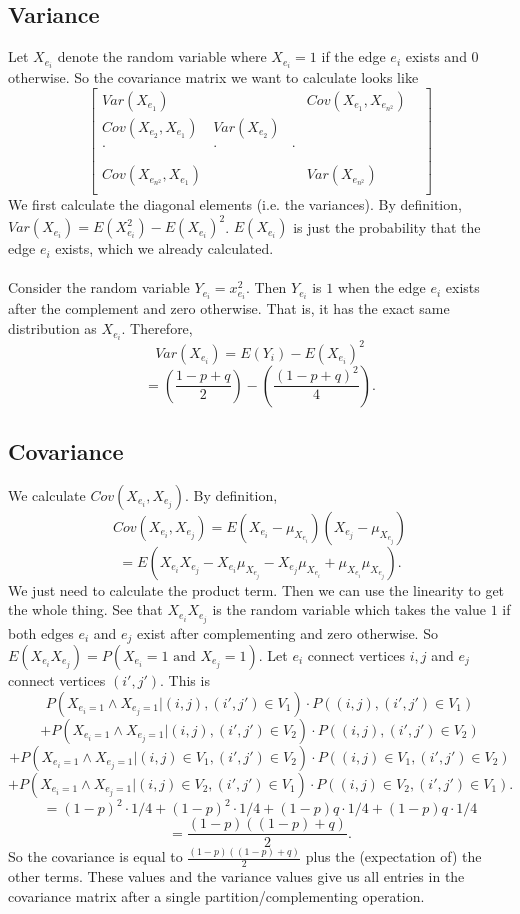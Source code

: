 \documentclass{article}
\begin{document}
\subsection{Variance}
Let $X_{e_i}$ denote the random variable where $X_{e_i} = 1$ if the edge $e_i$ exists and $0$ otherwise. So the covariance matrix we want to calculate looks like $$\begin{bmatrix}
    Var(X_{e_1}) & & & Cov(X_{e_1}, X_{e_{n^2}})\\
    Cov(X_{e_2}, X_{e_1}) & Var(X_{e_2}) & & & \\
    . & . & . \\
    \\
    \\
    Cov(X_{e_{n^2}}, X_{e_1}) & & & Var(X_{e_{n^2}})\\
\end{bmatrix}$$
We first calculate the diagonal elements (i.e. the variances). By definition, $Var(X_{e_i}) = E(X_{e_i}^2) - E(X_{e_i})^2$. $E(X_{e_i})$ is just the probability that the edge $e_i$ exists, which we already calculated. 
\\
\\
Consider the random variable $Y_{e_i} = x_{e_i}^2$. Then $Y_{e_i}$ is $1$ when the edge $e_i$ exists after the complement and zero otherwise. That is, it has the exact same distribution as $X_{e_i}$. Therefore, $$Var(X_{e_i}) = E(Y_i) - E(X_{e_i})^2$$ $$= \left( \frac{1 - p + q}{2}\right) - \left(\frac{(1-p+q)^2}{4}\right).$$ 
\subsection{Covariance}
We calculate $Cov(X_{e_i}, X_{e_j})$. By definition, $$Cov(X_{e_i}, X_{e_j}) = E(X_{e_i} - \mu_{X_{e_i}})(X_{e_j} - \mu_{X_{e_j}})$$ $$= E(X_{e_i}X_{e_j} - X_{e_i}\mu_{X_{e_j}} - X_{e_j}\mu_{X_{e_i}} + \mu_{X_{e_i}}\mu_{X_{e_j}}).$$ We just need to calculate the product term. Then we can use the linearity to get the whole thing. See that $X_{e_i}X_{e_j}$ is the random variable which takes the value $1$ if both edges $e_i$ and $e_j$ exist after complementing and zero otherwise. So $E(X_{e_i}X_{e_j}) = P(X_{e_i} = 1 \text{ and }X_{e_j} = 1)$. Let $e_i$ connect vertices $i,j$ and $e_j$ connect vertices $(i',j')$. This is $$P(X_{e_i = 1} \land X_{e_j = 1} | (i,j), (i',j') \in V_1) \cdot P((i,j),(i',j') \in V_1)$$ $$+ P(X_{e_i = 1} \land X_{e_j = 1} | (i,j), (i',j') \in V_2) \cdot P((i,j),(i',j') \in V_2)$$ $$+ P(X_{e_i = 1} \land X_{e_j = 1} | (i,j) \in V_1, (i',j') \in V_2) \cdot P((i,j)\in V_1,(i',j') \in V_2)$$ $$+ P(X_{e_i = 1} \land X_{e_j = 1} | (i,j) \in V_2, (i',j') \in V_1) \cdot P((i,j) \in V_2,(i',j') \in V_1).$$ $$= (1-p)^2 \cdot 1/4 + (1-p)^2 \cdot 1/4 + (1-p)q \cdot 1/4 + (1-p)q \cdot 1/4$$ $$= \frac{(1-p)((1-p) + q)}{2}.$$
So the covariance is equal to $\frac{(1-p)((1-p) + q)}{2}$ plus the (expectation of) the other terms. These values and the variance values give us all entries in the covariance matrix after a single partition/complementing operation. 
\end{document}
